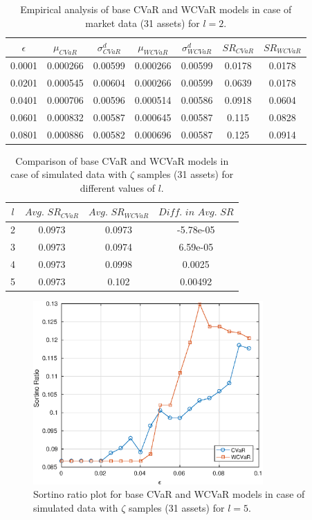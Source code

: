 \documentclass[12pt]{article}
\numberwithin{equation}{section}
\begin{document}
\begin{table}[!h]
\centering
\captionsetup{justification=centering}
\begin{tabular}{||c|c|c|c|c|c|c||}
\hline
$\epsilon$ & $\mu_{CVaR}$ & $\sigma_{CVaR}^{d}$ & $\mu_{WCVaR}$ & $\sigma_{WCVaR}^{d}$ & $SR_{CVaR}$ & $SR_{WCVaR}$\\
\hline
0.0001 & 0.000266 & 0.00599 & 0.000266 & 0.00599 & 0.0178 & 0.0178 \\
0.0201 & 0.000545 & 0.00604 & 0.000266 & 0.00599 & 0.0639 & 0.0178 \\
0.0401 & 0.000706 & 0.00596 & 0.000514 & 0.00586 & 0.0918 & 0.0604 \\
0.0601 & 0.000832 & 0.00587 & 0.000645 & 0.00587 & 0.115 & 0.0828 \\
0.0801 & 0.000886 & 0.00582 & 0.000696 & 0.00587 & 0.125 & 0.0914 \\
\hline
\end{tabular}
\caption{Empirical analysis of base CVaR and WCVaR models in case of market data (31 assets) for $l=2$.}
\label{tab:6.1}
\end{table}

\begin{table}[!h]
\centering
\captionsetup{justification=centering}
\begin{tabular}{||c|c|c|c||}
\hline
$l$ & $Avg. \, \, SR_{CVaR}$ & $Avg. \, \, SR_{WCVaR}$ & $Diff. \, \, in \, \, Avg. \, \, SR$ \\
\hline
2 & 0.0973 & 0.0973 & -5.78e-05 \\
3 & 0.0973 & 0.0974 & 6.59e-05 \\
4 & 0.0973 & 0.0998 & 0.0025 \\
5 & 0.0973 & 0.102 & 0.00492 \\
\hline
\end{tabular}
\caption{Comparison of base CVaR and WCVaR models in case of simulated data with $\zeta$ samples (31 assets) for different values of $l$.}
\label{avgtab:6.2}
\end{table}

\begin{figure}[!h]
\centering
\includegraphics[height=7.0cm]{cvar_30s_exact_5.eps}
\caption{Sortino ratio plot for base CVaR and WCVaR models in case of simulated data with $\zeta$ samples (31 assets) for $l=5$.}
\label{fig:6.2}
\end{figure}
\end{document}

